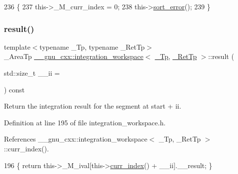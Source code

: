 \begin{DoxyCode}
236       \{
237         this->\_M\_curr\_index = 0;
238         this->\hyperlink{class____gnu__cxx_1_1integration__workspace_a01fe84e753d4654433b27bb35495c8aa}{sort\_error}();
239       \}
\end{DoxyCode}
\mbox{\label{class____gnu__cxx_1_1integration__workspace_a5b69a915d7023ea631a2e8a09a3a7e2e}} 
\subsubsection{\texorpdfstring{result()}{result()}}
{\footnotesize\ttfamily template$<$typename \+\_\+\+Tp, typename \+\_\+\+Ret\+Tp$>$ \\
\+\_\+\+Area\+Tp \hyperlink{class____gnu__cxx_1_1integration__workspace}{\+\_\+\+\_\+gnu\+\_\+cxx\+::integration\+\_\+workspace}$<$ \hyperlink{namespace____gnu__cxx_a3b19a9c800ca194374ef9172290f7d79}{\+\_\+\+Tp}, \hyperlink{namespace____gnu__cxx_a886e03ece3d53ff7fa6c098a40f93fa5}{\+\_\+\+Ret\+Tp} $>$\+::result (\begin{DoxyParamCaption}\item[{std\+::size\+\_\+t}]{\+\_\+\+\_\+ii = {} }\end{DoxyParamCaption}) const\hspace{0.3cm}{\ttfamily [inline]}}

Return the integration result for the segment at start + ii. 

Definition at line 195 of file integration\+\_\+workspace.\+h.



References \+\_\+\+\_\+gnu\+\_\+cxx\+::integration\+\_\+workspace$<$ \+\_\+\+Tp, \+\_\+\+Ret\+Tp $>$\+::curr\+\_\+index().


\begin{DoxyCode}
196       \{ \textcolor{keywordflow}{return} this->\_M\_ival[this->\hyperlink{class____gnu__cxx_1_1integration__workspace_a51a384b1777615943add69f1895454f5}{curr\_index}() + \_\_ii].\_\_result; \}
\end{DoxyCode}
\mbox{\label{class____gnu__cxx_1_1integration__workspace_a1959842775432dfdeecc039c38ef838d}} 
